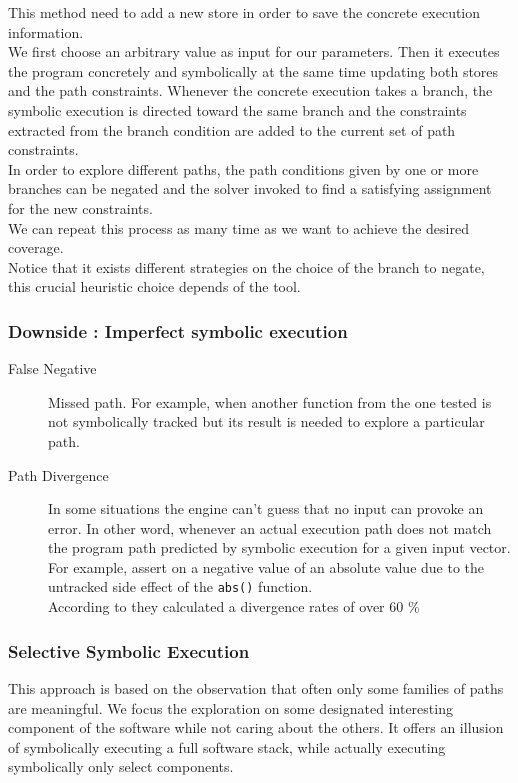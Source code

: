 \documentclass[11pt]{IEEEtran}
\begin{document}
    			This method need to add a new store in order to save the concrete execution information.\\
    			We first choose an arbitrary value as input for our parameters. Then it executes the program concretely and symbolically at the same time updating both stores and the path constraints. Whenever the concrete execution takes a branch, the symbolic execution is directed toward the same branch and the constraints extracted from the branch condition are added to the current set of path constraints.\\
    			In order to explore different paths, the path conditions given by one or more branches can be negated and the solver invoked to find a satisfying assignment for the new constraints.\\
    			We can repeat this process as many time as we want to achieve the desired coverage.\\

    			Notice that it exists different strategies on the choice of the branch to negate, this crucial heuristic choice depends of the tool.\\

    		\subsubsection*{Downside : Imperfect symbolic execution}
    			\begin{description}
    				\item[False Negative] Missed path. For example, when another function from the one tested is not symbolically tracked but its result is needed to explore a particular path.
    				\item[Path Divergence] In some situations the engine can't guess that no input can provoke an error. In other word, whenever an actual execution path does not match the program path predicted by symbolic execution for a given input vector. For example, assert on a negative value of an absolute value due to the untracked side effect of the \texttt{abs()} function.\\
    				According to \cite{Godefroid2008AutomatedWF} they calculated a divergence rates of over 60 \%
    			\end{description}

    	\subsubsection{Selective Symbolic Execution}
    	\label{subsec:selectiveSymbolicExec}
    		This approach is based on the observation that often only some families of paths are meaningful\cite{chipounov2012s2e}. We focus the exploration on some designated interesting component of the software while not caring about the others. It offers an illusion of symbolically executing a full software stack, while actually executing symbolically only select components.\\
\end{document}
